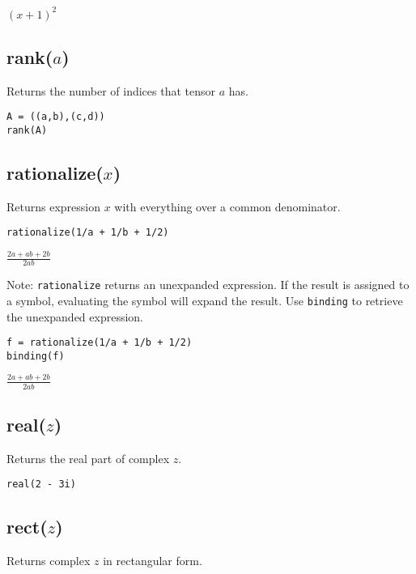 \noindent
$\displaystyle (x+1)^2$

\subsection*{rank($a$)}

Returns the number of indices that tensor $a$ has.

{\color{blue}
\begin{verbatim}
A = ((a,b),(c,d))
rank(A)
\end{verbatim}
}


\subsection*{rationalize($x$)}

Returns expression $x$ with everything over a common denominator.

{\color{blue}
\begin{verbatim}
rationalize(1/a + 1/b + 1/2)
\end{verbatim}
}

\noindent
$\displaystyle \frac{2a+ab+2b}{2ab}$

\bigskip
\noindent
Note:
\verb$rationalize$
returns an unexpanded expression.
If the result is assigned to a symbol, evaluating the symbol will expand the result.
Use
\verb$binding$
to retrieve the unexpanded expression.

{\color{blue}
\begin{verbatim}
f = rationalize(1/a + 1/b + 1/2)
binding(f)
\end{verbatim}
}

\noindent
$\displaystyle \frac{2a+ab+2b}{2ab}$

\subsection*{real($z$)}

Returns the real part of complex $z$.

{\color{blue}
\begin{verbatim}
real(2 - 3i)
\end{verbatim}
}


\subsection*{rect($z$)}

Returns complex $z$ in rectangular form.

